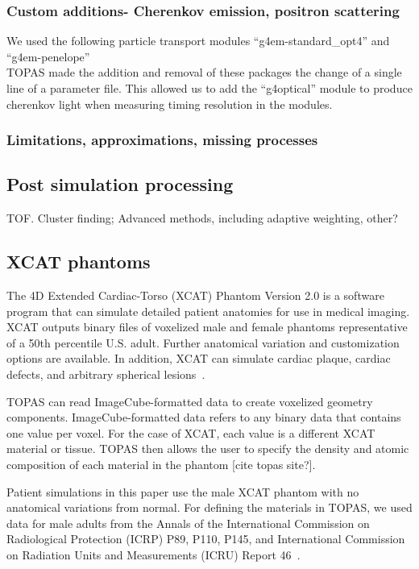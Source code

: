 \documentclass[12pt]{article}
\begin{document}
\subsubsection{Custom additions- Cherenkov emission, positron scattering}

We used the following particle transport modules ``g4em-standard\_opt4'' and ``g4em-penelope''\\
TOPAS made the addition and removal of these packages the change of a single line of a parameter file. This allowed us to add the ``g4optical'' module to produce cherenkov light when measuring timing resolution in the modules.


\subsubsection{Limitations, approximations, missing processes}

\subsection{Post simulation processing}


TOF. Cluster finding; Advanced methods, including adaptive weighting, other?

\subsection{XCAT phantoms}
\label{XCAT_phantoms}
The 4D Extended Cardiac-Torso (XCAT) Phantom Version 2.0 is a software program that can simulate detailed patient anatomies for use in medical imaging. XCAT outputs binary files of voxelized male and female phantoms representative of a 50th percentile U.S. adult. Further anatomical variation and customization options are available. In addition, XCAT can simulate cardiac plaque, cardiac defects, and arbitrary spherical lesions~\cite{xcat_2010_paper}.

TOPAS can read ImageCube-formatted data to create voxelized geometry components. ImageCube-formatted data refers to any binary data that contains one value per voxel. For the case of XCAT, each value is a different XCAT material or tissue. TOPAS then allows the user to specify the density and atomic composition of each material in the phantom [cite topas site?].

Patient simulations in this paper use the male XCAT phantom with no anatomical variations from normal. For defining the materials in TOPAS, we used data for male adults from the Annals of the International Commission on Radiological Protection (ICRP) P89, P110, P145, and International Commission on Radiation Units and Measurements (ICRU) Report 46~\cite{icrp89, icrp110, icrp145, icru46}.
\end{document}
